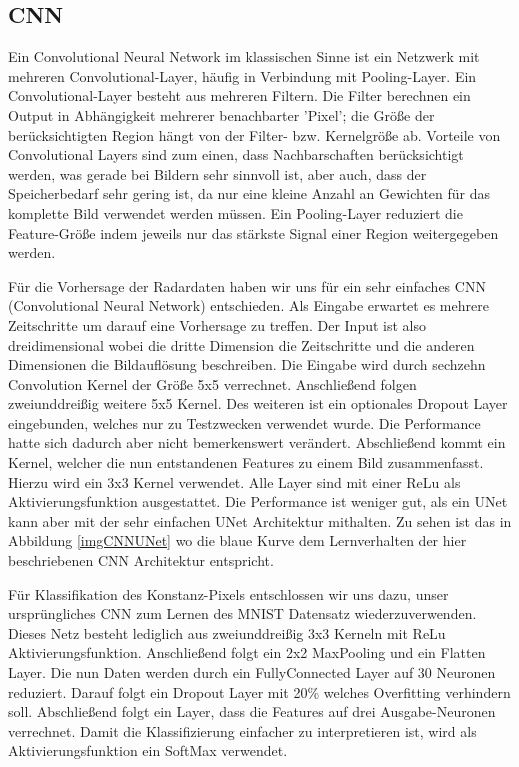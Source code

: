 \subsection{CNN}
\label{kapitelCNN}
Ein Convolutional Neural Network im klassischen Sinne ist ein Netzwerk mit mehreren Convolutional-Layer, häufig in Verbindung mit Pooling-Layer. Ein Convolutional-Layer besteht aus mehreren Filtern. Die Filter berechnen ein Output in Abhängigkeit mehrerer benachbarter 'Pixel'; die Größe der berücksichtigten Region hängt von der Filter- bzw. Kernelgröße ab.
Vorteile von Convolutional Layers sind zum einen, dass Nachbarschaften berücksichtigt werden, was gerade bei Bildern sehr sinnvoll ist, aber auch, dass der Speicherbedarf sehr gering ist, da nur eine kleine Anzahl an Gewichten für das komplette Bild verwendet werden müssen.
Ein Pooling-Layer reduziert die Feature-Größe indem jeweils nur das stärkste Signal einer Region weitergegeben werden.

Für die Vorhersage der Radardaten haben wir uns für ein sehr einfaches CNN (Convolutional Neural Network) entschieden.
Als Eingabe erwartet es mehrere Zeitschritte um darauf eine Vorhersage zu treffen. Der Input ist also dreidimensional wobei die dritte Dimension die Zeitschritte und die anderen Dimensionen die Bildauflösung beschreiben. Die Eingabe wird durch sechzehn Convolution Kernel der Größe 5x5 verrechnet. Anschließend folgen zweiunddreißig weitere 5x5 Kernel. Des weiteren ist ein optionales Dropout Layer eingebunden, welches nur zu Testzwecken verwendet wurde. Die Performance hatte sich dadurch aber nicht bemerkenswert verändert. Abschließend kommt ein Kernel, welcher die nun entstandenen Features zu einem Bild zusammenfasst. Hierzu wird ein 3x3 Kernel verwendet. Alle Layer sind mit einer ReLu als Aktivierungsfunktion ausgestattet.
Die Performance ist weniger gut, als ein UNet kann aber mit der sehr einfachen UNet Architektur mithalten. Zu sehen ist das in Abbildung \ref{imgCNNUNet} wo die blaue Kurve dem Lernverhalten der hier beschriebenen CNN Architektur entspricht.

Für Klassifikation des Konstanz-Pixels entschlossen wir uns dazu, unser ursprüngliches CNN zum Lernen des MNIST Datensatz wiederzuverwenden. Dieses Netz besteht lediglich aus zweiunddreißig 3x3 Kerneln mit ReLu Aktivierungsfunktion. Anschließend folgt ein 2x2 MaxPooling und ein Flatten Layer. Die nun  Daten werden durch ein FullyConnected Layer auf 30 Neuronen reduziert. Darauf folgt ein Dropout Layer mit 20\% welches Overfitting verhindern soll. Abschließend folgt ein Layer, dass die Features auf drei Ausgabe-Neuronen verrechnet. Damit die Klassifizierung einfacher zu interpretieren ist, wird als Aktivierungsfunktion ein SoftMax verwendet.

